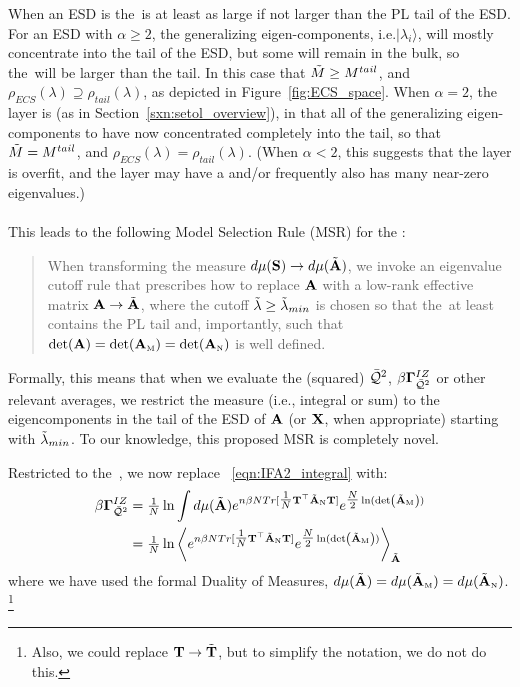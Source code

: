 When an ESD is \emph{\FatTailed} the~\ECS is at least as large if not larger than the PL tail of the ESD.
For an ESD with $\alpha\ge 2$, the generalizing eigen-components, i.e.$|\lambda_{i}\rangle$, will mostly
concentrate into the tail of the ESD, but some will remain in the bulk, so
the~\ECS will be larger than the tail.
In this case that $\tilde{M}\ge M^{tail}$,
and
$\rho_{ECS}(\lambda)\supseteq\rho_{tail}(\lambda)$, as depicted in Figure~\ref{fig:ECS_space}.
When $\alpha=2$,  the layer is \Ideal (as in Section~\ref{sxn:setol_overview}),
in that all of the generalizing eigen-components to have now concentrated completely into the tail, so that
 $\tilde{M}=M^{tail}$,
and
$\rho_{ECS}(\lambda)=\rho_{tail}(\lambda)$.
(When $\alpha< 2$, this suggests that the layer is overfit, and the layer may have a \CorrelationTrap and/or
frequently also has many near-zero eigenvalues.)
\\
\\
This leads to the following Model Selection Rule (MSR) for the \ECS:
\begin{quote}
  When transforming the measure $d\mu({\mathbf{S}}) \rightarrow d\mu(\tilde{\mathbf{A}})$, we invoke an eigenvalue cutoff rule that
  prescribes how to replace $\mathbf{A}$ with a low-rank effective matrix $\mathbf{A}\rightarrow\tilde{\mathbf{A}}$,
  where the cutoff $\tilde{\lambda}\ge{\tilde{\lambda}_{min}}$ is chosen so that the~\ECS at least contains the PL tail
  and, importantly, such that $\det(\mathbf{A})=\det({\mathbf{A}}_{\text{\tiny M}})=\det({\mathbf{A}}_{\text{\tiny N}})$ is well defined.  
\end{quote}
Formally, this means that when we evaluate the \Quality (squared) $\bar{\mathcal{Q}}^{2}$, \GeneratingFunction $\beta\mathbf{\Gamma}^{IZ}_{\bar{\mathcal{Q}}^{2}}$
or other relevant averages, we restrict the measure (i.e., integral or sum) to the eigencomponents in the tail of the ESD of
$\mathbf{A}$ (or $\mathbf{X}$, when appropriate)
starting with ${\tilde{\lambda}_{min}}$.  
To our knowledge, this proposed MSR is completely novel.%

Restricted to the~\ECS, we now replace \EQN~\ref{eqn:IFA2_integral} with:
\begin{align}
  \nonumber 
  \beta\mathbf{\Gamma}^{IZ}_{\bar{\mathcal{Q}}^{2}} 
  &=
    \tfrac{1}{N}
  \ln \int d\mu(\tilde{\mathbf{A}})
  e^{n\beta N Tr[\tfrac{1}{N}{\mathbf{T}}^{\top}\tilde{\mathbf{A}}_{\text{\tiny N}}{\mathbf{T}}] }
  e^{\tfrac{N}{2}\ln(\mbox{}{\text{det}}\left(\tilde{\mathbf{A}}_{\text{\tiny M}}\right))} \\
  \label{eqn:IFA2_braket}
  & =
    \tfrac{1}{N}
  \ln
  \left\langle
  e^{n\beta N Tr[\tfrac{1}{N}{\mathbf{T}}^{\top}\tilde{\mathbf{A}}_{\text{\tiny N}}{\mathbf{T}}] }
  e^{\tfrac{N}{2}\ln(\mbox{}{\text{det}}\left(\tilde{\mathbf{A}}_{\text{\tiny M}}\right))}
    \right\rangle_{\tilde{\mathbf{A}}}
\end{align}
where we have used the formal Duality of Measures, $d\mu(\tilde{\mathbf{A}})=d\mu(\tilde{\mathbf{A}}_{\text{\tiny M}})=d\mu(\tilde{\mathbf{A}}_{\text{\tiny N}})$.
\footnote{Also, we could replace ${\mathbf{T}}\rightarrow\tilde{\mathbf{T}}$, but to simplify the notation, we do not do this.}

